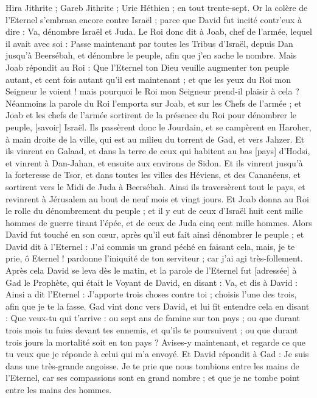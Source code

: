\begin{multicols}{2}
Hira Jithrite ; Gareb Jithrite ;
Urie Héthien ; en tout trente-sept.
\VerseOne{}Or la colère de l'Eternel s'embrasa encore contre Israël ; parce que David fut incité contr'eux à dire : Va, dénombre Israël et Juda.
Le Roi donc dit à Joab, chef de l'armée, lequel il avait avec soi : Passe maintenant par toutes les Tribus d'Israël, depuis Dan jusqu'à Beersébah, et dénombre le peuple, afin que j'en sache le nombre.
Mais Joab répondit au Roi : Que l'Eternel ton Dieu veuille augmenter ton peuple autant, et cent fois autant qu'il est maintenant ; et que les yeux du Roi mon Seigneur le voient ! mais pourquoi le Roi mon Seigneur prend-il plaisir à cela ?
Néanmoins la parole du Roi l'emporta sur Joab, et sur les Chefs de l'armée ; et Joab et les chefs de l'armée sortirent de la présence du Roi pour dénombrer le peuple, [savoir] Israël.
Ils passèrent donc le Jourdain, et se campèrent en Haroher, à main droite de la ville, qui est au milieu du torrent de Gad, et vers Jahzer.
Et ils vinrent en Galaad, et dans la terre de ceux qui habitent au bas [pays] d'Hodsi, et vinrent à Dan-Jahan, et ensuite aux environs de Sidon.
Et ils vinrent jusqu'à la forteresse de Tsor, et dans toutes les villes des Héviens, et des Cananéens, et sortirent vers le Midi de Juda à Beersébah.
Ainsi ils traversèrent tout le pays, et revinrent à Jérusalem au bout de neuf mois et vingt jours.
Et Joab donna au Roi le rolle du dénombrement du peuple ; et il y eut de ceux d'Israël huit cent mille hommes de guerre tirant l'épée, et de ceux de Juda cinq cent mille hommes.
Alors David fut touché en son cœur, après qu'il eut fait ainsi dénombrer le peuple ; et David dit à l'Eternel : J'ai commis un grand péché en faisant cela, mais, je te prie, ô Eternel ! pardonne l'iniquité de ton serviteur ; car j'ai agi très-follement.
Après cela David se leva dès le matin, et la parole de l'Eternel fut [adressée] à Gad le Prophète, qui était le Voyant de David, en disant :
Va, et dis à David : Ainsi a dit l'Eternel : J'apporte trois choses contre toi ; choisis l'une des trois, afin que je te la fasse.
Gad vint donc vers David, et lui fit entendre cela en disant : Que veux-tu qui t'arrive : ou sept ans de famine sur ton pays ; ou que durant trois mois tu fuies devant tes ennemis, et qu'ils te poursuivent ; ou que durant trois jours la mortalité soit en ton pays ? Avises-y maintenant, et regarde ce que tu veux que je réponde à celui qui m'a envoyé.
Et David répondit à Gad : Je suis dans une très-grande angoisse. Je te prie que nous tombions entre les mains de l'Eternel, car ses compassions sont en grand nombre ; et que je ne tombe point entre les mains des hommes.

\end{multicols}
